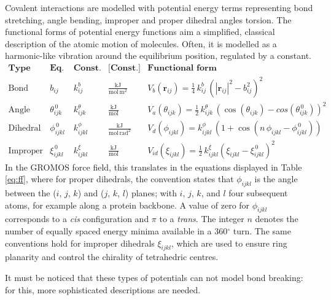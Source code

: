 \documentclass[graybox]{svmult}
\begin{document}
 Covalent interactions are modelled with potential energy terms representing bond stretching, angle bending, improper and proper dihedral angles torsion. 
%
The functional forms of potential energy functions aim a simplified, classical description of the atomic motion of molecules. Often, it is modelled as a harmonic-like vibration around the equilibrium position, regulated by a constant.
%
\begin{equation} \label{eq:ff}
\begin{array}{lcccl}
\textbf{Type} & \textbf{Eq. pos.} & \textbf{Const.} & \textbf{[Const.]} & \textbf{Functional form} \\
\hline 
  \text{Bond} & b_{ij} & k^b_{ij} & \frac{\text{kJ}}{\text{mol}\,\text{m}^2} & V_b(\textbf{r}_{ij}) = \frac{1}{4}\,k^b_{ij}\,\left(|\textbf{r}_{ij}|^2 - b_{ij}^2\right)^2 \\ 
  \text{Angle} & \theta^{\, 0}_{ijk} & k^\theta_{ijk} & \frac{\text{kJ}}{\text{mol}}  & V_a(\theta_{ijk}) = \frac{1}{2}\,k^\theta_{ijk}\,\left(\cos\left(\theta_{ijk}\right) - cos\left(\theta^{\, 0}_{ijk}\right)\right)^2 \\
  \text{Dihedral} & \phi_{ijkl}^{\, 0} & k_{ijkl}^\phi & \frac{\text{kJ}}{\text{mol}\,\text{rad}^2}  & V_d(\phi_{ijkl}) = k_{ijkl}^\phi\,\left( 1 + \cos\left( n \, \phi_{ijkl} - \phi_{ijkl}^{\, 0} \right) \right) \\
  \text{Improper} & \xi_{ijkl}^{\, 0} & k_{ijkl}^\xi & \frac{\text{kJ}}{\text{mol}}  & V_{id} (\xi_{ijkl}) = \frac{1}{2}\,k_{ijkl}^\xi \left( \xi_{ijkl} - \xi_{ijkl}^{\, 0} \right)^2
 \end{array}
\end{equation}
In the GROMOS force field, this translates in the equations displayed in Table \ref{eq:ff}, where for proper dihedrals, the convention states that $\phi_{ijkl}$ is the angle between the ($i$, $j$, $k$) and ($j$, $k$, $l$) planes; with $i$, $j$, $k$, and $l$ four subsequent atoms, for example along a protein backbone. A value of zero for $\phi_{ijkl}$ corresponds to a \textit{cis} configuration and $\pi$ to a \emph{trans}. The integer $n$ denotes the number of equally spaced energy minima available in a 360$^\circ$ turn.
%
The same conventions hold for improper dihedrals $\xi_{ijkl}$, which are used to ensure ring planarity and control the chirality of tetrahedric centres.

It must be noticed that these types of potentials can not model bond breaking: for this, more sophisticated descriptions are needed.
\end{document}
